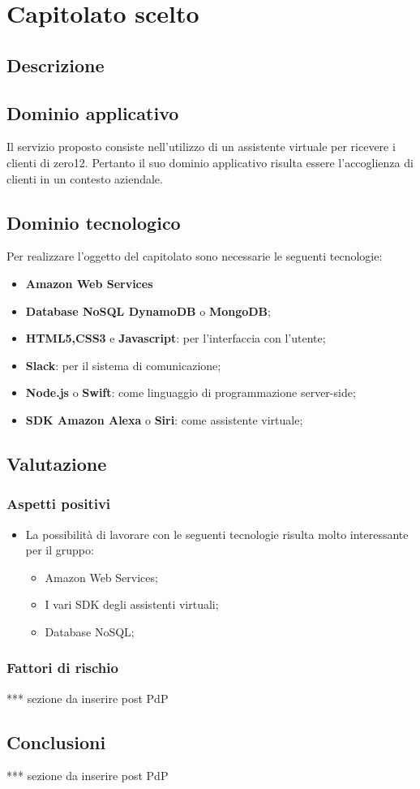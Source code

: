 \section {Capitolato scelto}
	\subsection {Descrizione}
		\SCOPO
	\subsection {Dominio applicativo}
Il servizio proposto consiste nell'utilizzo di un assistente virtuale per ricevere i clienti di zero12. Pertanto il suo dominio applicativo risulta essere l'accoglienza di clienti in un contesto aziendale.
	\subsection {Dominio tecnologico}
		Per realizzare l'oggetto del capitolato sono necessarie le seguenti tecnologie:
		\begin {itemize}
			\item \textbf{Amazon Web Services}
			\item \textbf{Database NoSQL DynamoDB} o \textbf{MongoDB};
			\item \textbf{HTML5,CSS3} e \textbf{Javascript}: per l'interfaccia con l'utente;
			\item \textbf{Slack}: per il sistema di comunicazione;
			\item \textbf{Node.js} o \textbf{Swift}: come linguaggio di programmazione
 server-side;
 			\item \textbf{SDK Amazon Alexa} o \textbf{Siri}: come assistente virtuale;

		\end {itemize}
	\subsection {Valutazione}
		\subsubsection {Aspetti positivi}
			\begin {itemize}
				\item La possibilità di lavorare con le seguenti tecnologie risulta molto interessante per il gruppo:
				 \begin {itemize}
				 	\item Amazon Web Services;
				 	\item I vari SDK degli assistenti virtuali;
				 	\item Database NoSQL;
				 \end {itemize}
			\end {itemize}
		\subsubsection {Fattori di rischio}
	*** sezione da inserire post PdP
	\subsection {Conclusioni}
	*** sezione da inserire post PdP